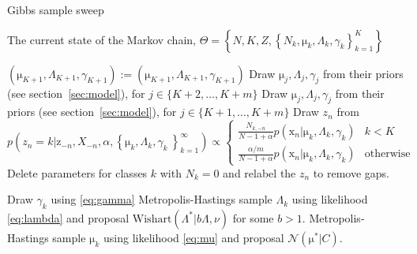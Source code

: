 \documentclass[english]{article}
\newcommand{\+}[1]{\ensuremath{\boldsymbol{\mathrm{#1}}}}
\begin{document}
\begin{algorithm}
\caption{Gibbs sample sweep}\label{alg:gibbs}
\begin{algorithmic}
\Require The current state of the Markov chain, $\Theta = \left\{ N, K, Z, \left\{ N_k, \+\mu_k, \Lambda_k, \gamma_k \right\}_{k=1}^K  \right\}$
\Statex

    \State $\left( \+\mu_{K+1}, \Lambda_{K+1}, \gamma_{K+1} \right) := \left( \+\mu_{K+1}, \Lambda_{K+1}, \gamma_{K+1} \right)$ 
    \State Draw $\+\mu_j, \Lambda_j, \gamma_j$ from their priors (see section~\ref{sec:model}), for $j \in \{K+2, \ldots, K+m\}$
  \Else
    \State Draw $\+\mu_j, \Lambda_j, \gamma_j$ from their priors (see section~\ref{sec:model}), for $j \in \{K+1, \ldots, K+m\}$
  \EndIf
  \State Draw $z_n$ from 
  \[
  p(z_{n}=k|\+{z}_{-n},X_{-n},\alpha,\left\{ \+\mu_k,\Lambda_k,\gamma_k\ \right\}_{k=1}^{\infty}) \propto \begin{cases}
  \frac{N_{k,-n}}{N-1+\alpha} p(\+x_n | \+\mu_k, \Lambda_k, \gamma_k) & k < K\\
  \frac{\alpha / m}{N-1+\alpha} p(\+x_n | \+\mu_k, \Lambda_k, \gamma_k) & \text{otherwise}
  \end{cases} \label{eq:nealalg8}
  \]
  \State Delete parameters for classes $k$ with $N_k = 0$ and relabel the $z_n$ to remove gaps.
\EndFor

  \State Draw $\gamma_k$ using \eqref{eq:gamma}
  \State Metropolis-Hastings sample $\Lambda_k$ using likelihood \eqref{eq:lambda} and proposal $\text{Wishart}(\Lambda^{*} | b \Lambda, \nu)$ for some $b > 1$.
  \State Metropolis-Hastings sample $\+\mu_k$ using likelihood \eqref{eq:mu} and proposal $\mathcal{N}( \+\mu^{*} | C )$.
\EndFor

\end{algorithmic}
\end{algorithm}
\end{document}
